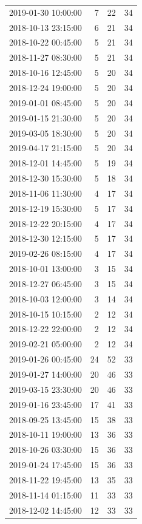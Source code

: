 \begin{tabular}{lrrr}
2019-01-30 10:00:00 & 7 & 22 & 34 \\
2018-10-13 23:15:00 & 6 & 21 & 34 \\
2018-10-22 00:45:00 & 5 & 21 & 34 \\
2018-11-27 08:30:00 & 5 & 21 & 34 \\
2018-10-16 12:45:00 & 5 & 20 & 34 \\
2018-12-24 19:00:00 & 5 & 20 & 34 \\
2019-01-01 08:45:00 & 5 & 20 & 34 \\
2019-01-15 21:30:00 & 5 & 20 & 34 \\
2019-03-05 18:30:00 & 5 & 20 & 34 \\
2019-04-17 21:15:00 & 5 & 20 & 34 \\
2018-12-01 14:45:00 & 5 & 19 & 34 \\
2018-12-30 15:30:00 & 5 & 18 & 34 \\
2018-11-06 11:30:00 & 4 & 17 & 34 \\
2018-12-19 15:30:00 & 5 & 17 & 34 \\
2018-12-22 20:15:00 & 4 & 17 & 34 \\
2018-12-30 12:15:00 & 5 & 17 & 34 \\
2019-02-26 08:15:00 & 4 & 17 & 34 \\
2018-10-01 13:00:00 & 3 & 15 & 34 \\
2018-12-27 06:45:00 & 3 & 15 & 34 \\
2018-10-03 12:00:00 & 3 & 14 & 34 \\
2018-10-15 10:15:00 & 2 & 12 & 34 \\
2018-12-22 22:00:00 & 2 & 12 & 34 \\
2019-02-21 05:00:00 & 2 & 12 & 34 \\
2019-01-26 00:45:00 & 24 & 52 & 33 \\
2019-01-27 14:00:00 & 20 & 46 & 33 \\
2019-03-15 23:30:00 & 20 & 46 & 33 \\
2019-01-16 23:45:00 & 17 & 41 & 33 \\
2018-09-25 13:45:00 & 15 & 38 & 33 \\
2018-10-11 19:00:00 & 13 & 36 & 33 \\
2018-10-26 03:30:00 & 15 & 36 & 33 \\
2019-01-24 17:45:00 & 15 & 36 & 33 \\
2018-11-22 19:45:00 & 13 & 35 & 33 \\
2018-11-14 01:15:00 & 11 & 33 & 33 \\
2018-12-02 14:45:00 & 12 & 33 & 33 \\

\end{tabular}
